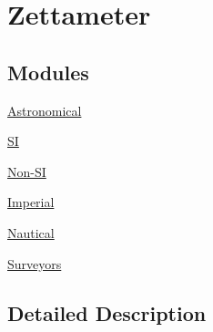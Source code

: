 \hypertarget{group___e_g_x_math-_conversions-_length_conversions-_s_i-_zettameter}{}\section{Zettameter}
\label{group___e_g_x_math-_conversions-_length_conversions-_s_i-_zettameter}
\subsection*{Modules}
\begin{DoxyCompactItemize}
\item 
\mbox{\hyperlink{group___e_g_x_math-_conversions-_length_conversions-_s_i-_zettameter-_astronomical}{Astronomical}}
\item 
\mbox{\hyperlink{group___e_g_x_math-_conversions-_length_conversions-_s_i-_zettameter-_s_i}{SI}}
\item 
\mbox{\hyperlink{group___e_g_x_math-_conversions-_length_conversions-_s_i-_zettameter-_non-_s_i}{Non-\/\+SI}}
\item 
\mbox{\hyperlink{group___e_g_x_math-_conversions-_length_conversions-_s_i-_zettameter-_imperial}{Imperial}}
\item 
\mbox{\hyperlink{group___e_g_x_math-_conversions-_length_conversions-_s_i-_zettameter-_nautical}{Nautical}}
\item 
\mbox{\hyperlink{group___e_g_x_math-_conversions-_length_conversions-_s_i-_zettameter-_surveyors}{Surveyors}}
\end{DoxyCompactItemize}


\subsection{Detailed Description}

